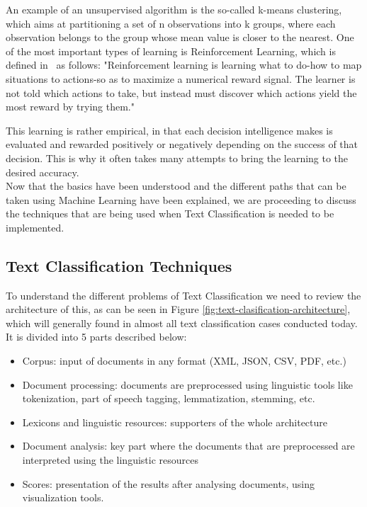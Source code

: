 An example of an unsupervised algorithm is the so-called k-means clustering, which aims at partitioning a set of n observations into k groups, where each observation belongs to the group whose mean value is closer to the nearest.
One of the most important types of learning is Reinforcement Learning, which is defined in~\cite{sutton2018reinforcement} as follows: "Reinforcement learning is learning what to do-how to map situations to actions-so as to maximize a numerical reward signal. The learner is not told which actions to take, but instead must discover which actions yield the most reward by trying them."

This learning is rather empirical, in that each decision intelligence makes is evaluated and rewarded positively or negatively depending on the success of that decision. This is why it often takes many attempts to bring the learning to the desired accuracy.\\

Now that the basics have been understood and the different paths that can be taken using Machine Learning have been explained, we are proceeding to discuss the techniques that are being used when Text Classification is needed to be implemented.


\subsection{Text Classification Techniques}

To understand the different problems of Text Classification we need to review the architecture of this, as can be seen in Figure \ref{fig:text-clasification-architecture}, which will generally found in almost all text classification cases conducted today. It is divided into 5 parts described below:


\begin{itemize}
    \item Corpus: input of documents in any format (XML, JSON, CSV, PDF, etc.)
    \item Document processing: documents are preprocessed using linguistic tools like tokenization, part of speech tagging, lemmatization, stemming, etc.
    \item Lexicons and linguistic resources: supporters of the whole architecture
    \item Document analysis: key part where the documents that are preprocessed are interpreted using the linguistic resources
    \item Scores: presentation of the results after analysing documents, using visualization tools.
\end{itemize}


